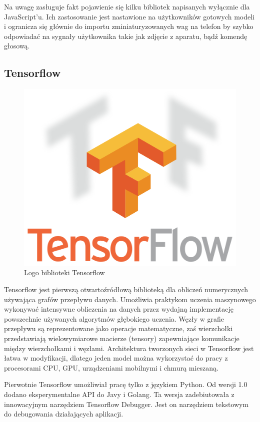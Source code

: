 \documentclass[12pt,a4paper,twoside,titlepage,openright]{book}
\begin{document}
Na uwagę zasługuje fakt pojawienie się kilku bibliotek napisanych wyłącznie dla JavaScript'u. Ich zastosowanie jest nastawione na użytkowników gotowych modeli i ogranicza się głównie do importu zminiaturyzowanych wag na telefon by szybko odpowiadać na sygnały użytkownika takie jak zdjęcie z aparatu, bądź komendę głosową. 

\subsection{Tensorflow}
\begin{figure}[ht]
	\centering
			\includegraphics[resolution=100, scale=0.6]{Tensorflow.png}
		\caption{Logo biblioteki Tensorflow}
\end{figure}

Tensorflow jest pierwszą otwartoźródłową biblioteką dla obliczeń numerycznych używająca grafów przepływu danych. Umożliwia praktykom uczenia maszynowego wykonywać intensywne obliczenia na danych przez wydajną implementację powszechnie używanych algorytmów głębokiego uczenia. Węzły w grafie przepływu są reprezentowane jako operacje matematyczne, zaś wierzchołki przedstawiają wielowymiarowe macierze (tensory) zapewniające komunikacje między wierzchołkami i węzłami. Architektura tworzonych sieci w Tensorflow jest łatwa w modyfikacji, dlatego jeden model można wykorzystać do pracy z procesorami CPU, GPU, urządzeniami mobilnymi i chmurą mieszaną. \cite{DeepLearningTensorflow}

Pierwotnie Tensorflow umożliwiał pracę tylko z językiem Python. Od wersji 1.0 dodano eksperymentalne API do Javy i Golang. Ta wersja zadebiutowała z innowacyjnym narzędziem Tensorflow Debugger. Jest on narzędziem tekstowym do debugowania działających aplikacji.
\end{document}
